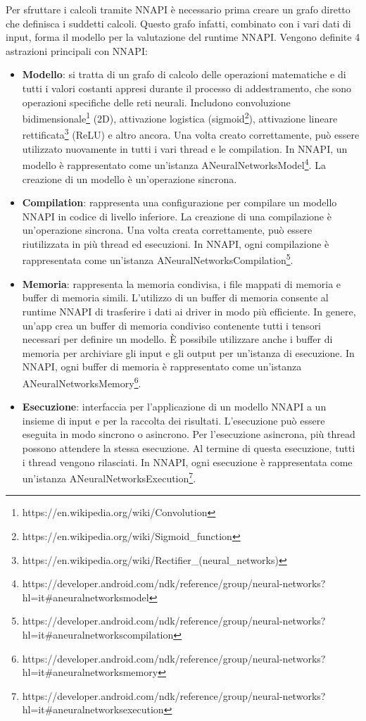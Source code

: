 Per sfruttare i calcoli tramite NNAPI è necessario prima creare un grafo diretto che definisca i suddetti calcoli. Questo grafo infatti, combinato con
i vari dati di input, forma il modello per la valutazione del runtime NNAPI. Vengono definite 4 astrazioni principali con NNAPI:
\begin{itemize}
    \item \textbf{Modello}: si tratta di un grafo di calcolo delle operazioni matematiche e di tutti i valori costanti appresi durante il processo
    di addestramento, che sono operazioni specifiche delle reti neurali. Includono convoluzione bidimensionale\footnote{https://en.wikipedia.org/wiki/Convolution}
    (2D), attivazione logistica (sigmoid\footnote{https://en.wikipedia.org/wiki/Sigmoid\_function}), attivazione lineare rettificata\footnote{https://en.wikipedia.org/wiki/Rectifier\_(neural\_networks)}
    (ReLU) e altro ancora. Una volta creato correttamente, può essere utilizzato nuovamente in tutti i vari thread e le compilation. In NNAPI, un modello
    è rappresentato come un'istanza ANeuralNetworksModel\footnote{https://developer.android.com/ndk/reference/group/neural-networks?hl=it\#aneuralnetworksmodel}.
    La creazione di un modello è un'operazione sincrona.
    \item \textbf{Compilation}: rappresenta una configurazione per compilare un modello NNAPI in codice di livello inferiore. La creazione di una
    compilazione è un'operazione sincrona. Una volta creata correttamente, può essere riutilizzata in più thread ed esecuzioni. In NNAPI, ogni
    compilazione è rappresentata come un'istanza ANeuralNetworksCompilation\footnote{https://developer.android.com/ndk/reference/group/neural-networks?hl=it\#aneuralnetworkscompilation}.
    \item \textbf{Memoria}: rappresenta la memoria condivisa, i file mappati di memoria e buffer di memoria simili. L'utilizzo di un buffer di memoria
    consente al runtime NNAPI di trasferire i dati ai driver in modo più efficiente. In genere, un'app crea un buffer di memoria condiviso contenente
    tutti i tensori necessari per definire un modello. È possibile utilizzare anche i buffer di memoria per archiviare gli input e gli output per un'istanza di
    esecuzione. In NNAPI, ogni buffer di memoria è rappresentato come un'istanza ANeuralNetworksMemory\footnote{https://developer.android.com/ndk/reference/group/neural-networks?hl=it\#aneuralnetworksmemory}.
    \item \textbf{Esecuzione}: interfaccia per l'applicazione di un modello NNAPI a un insieme di input e per la raccolta dei risultati. L'esecuzione
    può essere eseguita in modo sincrono o asincrono. Per l'esecuzione asincrona, più thread possono attendere la stessa esecuzione. Al termine di questa
    esecuzione, tutti i thread vengono rilasciati. In NNAPI, ogni esecuzione è rappresentata come un'istanza ANeuralNetworksExecution\footnote{https://developer.android.com/ndk/reference/group/neural-networks?hl=it\#aneuralnetworksexecution}.
\end{itemize}

